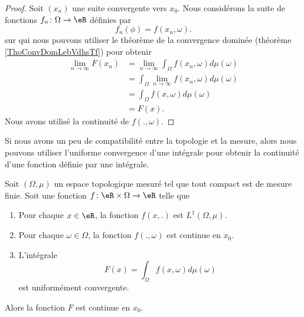 \begin{proof}
    Soit \( (x_n)\) une suite convergente vers \( x_0\). Nous considérons la suite de fonctions \( f_n\colon \Omega\to \eR\) définies par
    \begin{equation}
        f_n(\phi)=f(x_n,\omega).
    \end{equation}
    sur qui nous pouvons utiliser le théorème de la convergence dominée (théorème \ref{ThoConvDomLebVdhsTf}) pour obtenir
    \begin{subequations}
        \begin{align}
            \lim_{n\to \infty} F(x_n)&=\lim_{n\to \infty} \int_{\Omega}f(x_n,\omega)d\mu(\omega)\\
            &=\int_{\Omega}\lim_{n\to \infty} f(x_n,\omega)d\mu(\omega)\\
            &=\int_{\Omega}f(x,\omega)d\mu(\omega)\\
            &=F(x).
        \end{align}
    \end{subequations}
    Nous avons utilisé la continuité de \( f(.,\omega)\).
\end{proof}


Si nous avons un peu de compatibilité entre la topologie et la mesure, alors nous pouvons utiliser l'uniforme convergence d'une intégrale pour obtenir la continuité d'une fonction définie par une intégrale.

\begin{theorem} \label{ThotexmgE}
    Soit \( (\Omega,\mu)\) un espace topologique mesuré tel que tout compact est de mesure finie. Soit une fonction \( f\colon \eR\times \Omega\to \eR\) telle que
    \begin{enumerate}
        \item
            Pour chaque \( x\in \eR\), la fonction \( f(x,.)\) est \( L^1(\Omega,\mu)\).
        \item
            Pour chaque \( \omega\in \Omega\), la fonction \( f(.,\omega)\) est continue en \( x_0\).
        \item
            L'intégrale
            \begin{equation}
                F(x)=\int_{\Omega}f(x,\omega)d\mu(\omega)
            \end{equation}
            est uniformément convergente.
    \end{enumerate}
    Alors la fonction \( F\) est continue en \( x_0\).
\end{theorem}

